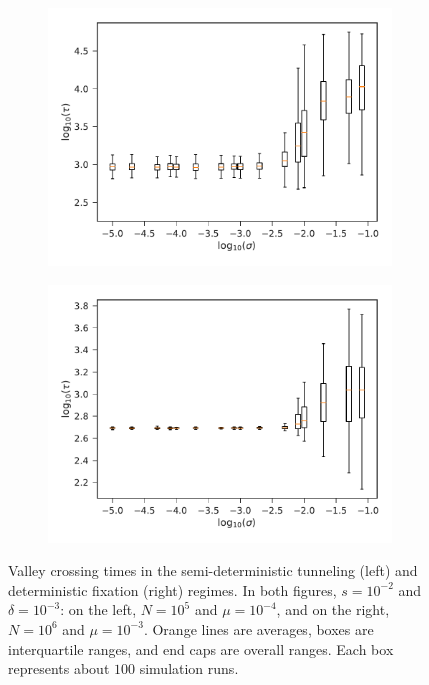 \documentclass[rmp]{revtex4}
\begin{document}
\begin{figure}
\begin{subfigure}[b]{0.4\textwidth}
\includegraphics[width=\textwidth]{Figures/det_tunnel.pdf}
\end{subfigure}
\begin{subfigure}[b]{0.4\textwidth}
\includegraphics[width=\textwidth]{Figures/det_fix.pdf}
\end{subfigure}
\caption{Valley crossing times in the semi-deterministic tunneling (left) and deterministic fixation (right) regimes. In both figures, $s = 10^{-2}$ and $\delta = 10^{-3}$: on the left, $N = 10^5$ and $\mu = 10^{-4}$, and on the right, $N = 10^6$ and $\mu = 10^{-3}$. Orange lines are averages, boxes are interquartile ranges, and end caps are overall ranges. Each box represents about $100$ simulation runs.}
\label{fig:deterministic}
\end{figure}
\end{document}
